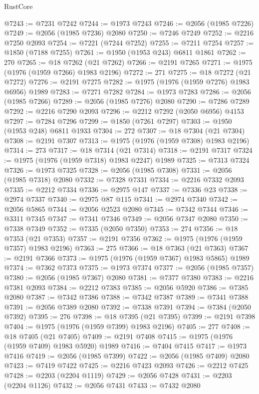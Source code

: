 \begin{lexlean}{RustCore}
\begin{coremodule}
@7243 := @7231 @7242
@7244 := @1973 @7243
@7246 := @2056 (@1985 @7226)
@7249 := @2056 (@1985 @7236) @2080
@7250 := @7246 @7249
@7252 := @2216 @7250 @2093
@7254 := @7221 (@7244 @7252)
@7255 := @7211 @7254
@7257 := @1850 (@7188 @7255)
@7261 := @1950 (@1953 @243) @6811 @1861
@7262 := 270
@7265 := @18 @7262 (@21 @7262)
@7266 := @2191 @7265
@7271 := @1975 (@1976 (@1959 @7266) @1983 @2196)
@7272 := 271
@7275 := @18 @7272 (@21 @7272)
@7276 := @2191 @7275
@7282 := @1975 (@1976 (@1959 @7276) @1983 @6956) @1989
@7283 := @7271 @7282
@7284 := @1973 @7283
@7286 := @2056 (@1985 @7266)
@7289 := @2056 (@1985 @7276) @2080
@7290 := @7286 @7289
@7292 := @2216 @7290 @2093
@7296 := @2212 @7292 (@2050 @6956) @4153
@7297 := @7284 @7296
@7299 := @1850 (@7261 @7297)
@7303 := @1950 (@1953 @248) @6811 @1933
@7304 := 272
@7307 := @18 @7304 (@21 @7304)
@7308 := @2191 @7307
@7313 := @1975 (@1976 (@1959 @7308) @1983 @2196)
@7314 := 273
@7317 := @18 @7314 (@21 @7314)
@7318 := @2191 @7317
@7324 := @1975 (@1976 (@1959 @7318) @1983 @2247) @1989
@7325 := @7313 @7324
@7326 := @1973 @7325
@7328 := @2056 (@1985 @7308)
@7331 := @2056 (@1985 @7318) @2080
@7332 := @7328 @7331
@7334 := @2216 @7332 @2093
@7335 := @2212 @7334
@7336 := @2975 @147
@7337 := @7336 @23
@7338 := @2974 @7337
@7340 := @2975 @87 @115
@7341 := @2974 @7340
@7342 := @2056 @5865
@7344 := @2056 @2523 @2080
@7345 := @7342 @7344
@7346 := @3311 @7345
@7347 := @7341 @7346
@7349 := @2056 @7347 @2080
@7350 := @7338 @7349
@7352 := @7335 (@2050 @7350)
@7353 := 274
@7356 := @18 @7353 (@21 @7353)
@7357 := @2191 @7356
@7362 := @1975 (@1976 (@1959 @7357) @1983 @2196)
@7363 := 275
@7366 := @18 @7363 (@21 @7363)
@7367 := @2191 @7366
@7373 := @1975 (@1976 (@1959 @7367) @1983 @5865) @1989
@7374 := @7362 @7373
@7375 := @1973 @7374
@7377 := @2056 (@1985 @7357)
@7380 := @2056 (@1985 @7367) @2080
@7381 := @7377 @7380
@7383 := @2216 @7381 @2093
@7384 := @2212 @7383
@7385 := @2056 @5920
@7386 := @7385 @2080
@7387 := @7342 @7386
@7388 := @7342 @7387
@7389 := @7341 @7388
@7391 := @2056 @7389 @2080
@7392 := @7338 @7391
@7394 := @7384 (@2050 @7392)
@7395 := 276
@7398 := @18 @7395 (@21 @7395)
@7399 := @2191 @7398
@7404 := @1975 (@1976 (@1959 @7399) @1983 @2196)
@7405 := 277
@7408 := @18 @7405 (@21 @7405)
@7409 := @2191 @7408
@7415 := @1975 (@1976 (@1959 @7409) @1983 @5920) @1989
@7416 := @7404 @7415
@7417 := @1973 @7416
@7419 := @2056 (@1985 @7399)
@7422 := @2056 (@1985 @7409) @2080
@7423 := @7419 @7422
@7425 := @2216 @7423 @2093
@7426 := @2212 @7425
@7428 := @2203 (@2204 @1119)
@7429 := @2056 @7428
@7431 := @2203 (@2204 @1126)
@7432 := @2056 @7431
@7433 := @7432 @2080

\end{coremodule}
\end{lexlean}
